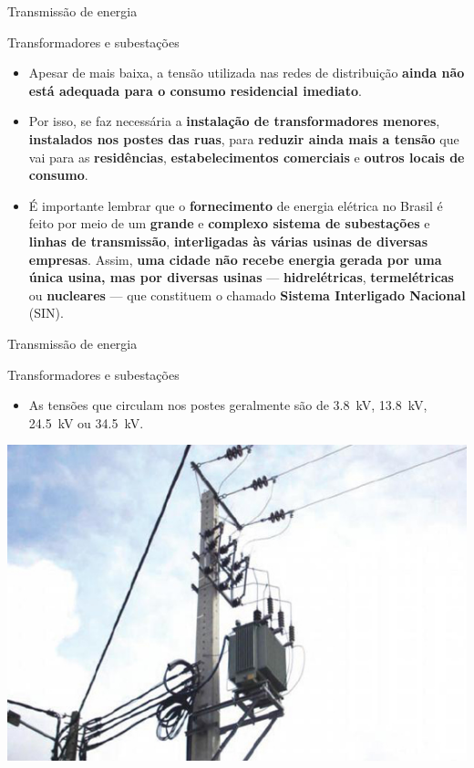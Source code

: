 \begin{frame}{Transmissão de energia}
	\begin{block}{Transformadores e subestações}
		\begin{itemize}
			\item Apesar de mais baixa, a tensão utilizada nas redes de distribuição \textbf{ainda não está adequada para o consumo residencial imediato}.
			\item Por isso, se faz necessária a \textbf{instalação de transformadores menores}, \textbf{instalados nos postes das ruas}, para \textbf{reduzir ainda mais a tensão} que vai para as \textbf{residências}, \textbf{estabelecimentos comerciais} e \textbf{outros locais de consumo}.
			\item É importante lembrar que o \textbf{fornecimento} de energia elétrica no Brasil é feito por meio de um \textbf{grande} e \textbf{complexo sistema de subestações} e \textbf{linhas de transmissão}, \textbf{interligadas às várias usinas de diversas empresas}. Assim, \textbf{uma cidade não recebe energia gerada por uma única usina, mas por diversas usinas} --- \textbf{hidrelétricas}, \textbf{termelétricas} ou \textbf{nucleares} --- que constituem o chamado \textbf{Sistema Interligado Nacional} (SIN).
		\end{itemize}
	\end{block}

\end{frame}


\begin{frame}{Transmissão de energia}
	\begin{block}{Transformadores e subestações}
		\begin{itemize}
			\item As tensões que circulam nos postes geralmente são de \SI{3.8}{\kilo\volt}, \SI{13.8}{\kilo\volt}, \SI{24.5}{\kilo\volt} ou \SI{34.5}{\kilo\volt}.
		\end{itemize}
	\end{block}

	\centering
	\includegraphics[height=0.65\textheight]{Figuras/Ch03/fig15}

\end{frame}


